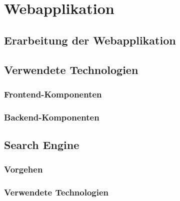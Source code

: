 \section{Webapplikation}
\subsection{Erarbeitung der Webapplikation}
\subsection{Verwendete Technologien}
\subsubsection{Frontend-Komponenten}
\subsubsection{Backend-Komponenten}
\subsection{Search Engine}
\subsubsection{Vorgehen}
\subsubsection{Verwendete Technologien}